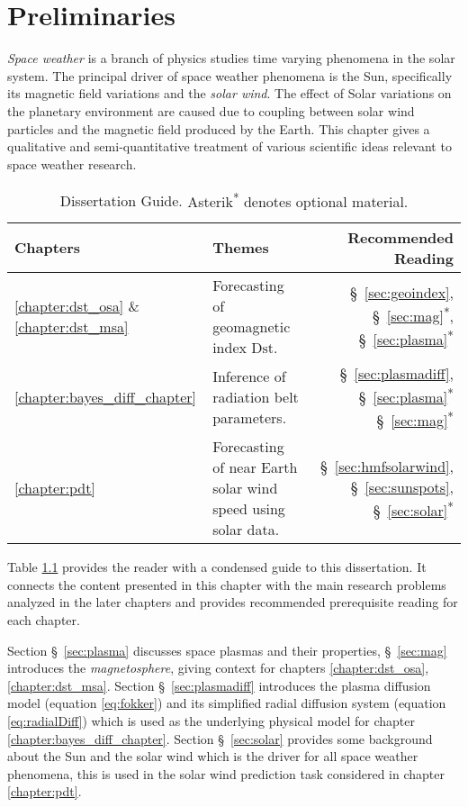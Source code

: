 \chapter{Preliminaries}\label{chapter:preliminaries}

\emph{Space weather} is a branch of physics studies time varying phenomena in the solar system. The principal 
driver of space weather phenomena is the Sun, specifically its magnetic field variations and the \emph{solar wind}.
The effect of Solar variations on the planetary environment are caused due to coupling between solar wind particles 
and the magnetic field produced by the Earth. This chapter gives a qualitative and semi-quantitative treatment of 
various scientific ideas relevant to space weather research.

\begin{table}
    \centering
    \begin{tabular}{l p{} r}
        \hline
        \textbf{Chapters} & \textbf{Themes} & \textbf{Recommended Reading}\\
        \hline
        \vspace{5pt}
        \ref{chapter:dst_osa} \& \ref{chapter:dst_msa} & Forecasting of geomagnetic index $\mathrm{Dst}$. & \S~\ref{sec:geoindex}, \S~\ref{sec:mag}\textsuperscript{*}, \S~\ref{sec:plasma}\textsuperscript{*} \\
        \ref{chapter:bayes_diff_chapter} & Inference of radiation belt parameters. & \S~\ref{sec:plasmadiff}, \S~\ref{sec:plasma}\textsuperscript{*} \S~\ref{sec:mag}\textsuperscript{*} \\
        \ref{chapter:pdt} & Forecasting of near Earth solar wind speed using solar data. & \S~\ref{sec:hmfsolarwind}, \S~\ref{sec:sunspots}, \S~\ref{sec:solar}\textsuperscript{*}\\
        \hline
    \end{tabular}
    \caption{Dissertation Guide. {\small Asterik\textsuperscript{*} denotes optional material.}}
    \label{table:chapterguide}
\end{table}

Table \ref{table:chapterguide} provides the reader with a condensed guide to this dissertation. 
It connects the content presented in this chapter with the main research problems analyzed in the later chapters 
and provides recommended prerequisite reading for each chapter.

Section \S~\ref{sec:plasma} discusses space plasmas and their properties, \S~\ref{sec:mag} introduces the 
\emph{magnetosphere}, giving context for chapters \ref{chapter:dst_osa},\ref{chapter:dst_msa}. 
Section \S~\ref{sec:plasmadiff} introduces the plasma diffusion model (equation \ref{eq:fokker}) and its simplified 
radial diffusion system (equation \ref{eq:radialDiff}) which is used as the underlying physical model for chapter 
\ref{chapter:bayes_diff_chapter}. Section \S~\ref{sec:solar} provides some background about the Sun and 
the solar wind which is the driver for all space weather phenomena, this is used in the solar wind prediction 
task considered in chapter \ref{chapter:pdt}.    


